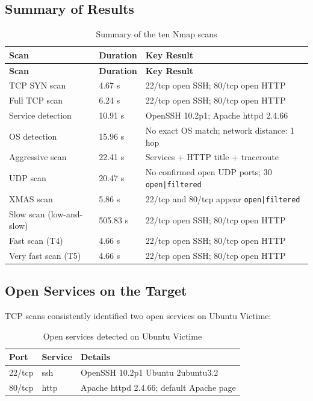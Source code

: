 \subsection{Summary of Results}

\begin{longtable}{p{3.2cm}p{2.2cm}p{7.5cm}}
\caption{Summary of the ten Nmap scans} \label{tab:synthese-scans} \\
\toprule
\textbf{Scan} & \textbf{Duration} & \textbf{Key Result} \\
\midrule
\endfirsthead
\toprule
\textbf{Scan} & \textbf{Duration} & \textbf{Key Result} \\
\midrule
\endhead
TCP SYN scan & 4.67 s & 22/tcp open SSH; 80/tcp open HTTP \\
Full TCP scan & 6.24 s & 22/tcp open SSH; 80/tcp open HTTP \\
Service detection & 10.91 s & OpenSSH 10.2p1; Apache httpd 2.4.66 \\
OS detection & 15.96 s & No exact OS match; network distance: 1 hop \\
Aggressive scan & 22.41 s & Services + HTTP title + traceroute \\
UDP scan & 20.47 s & No confirmed open UDP ports; 30 \texttt{open|filtered} \\
XMAS scan & 5.86 s & 22/tcp and 80/tcp appear \texttt{open|filtered} \\
Slow scan (low-and-slow) & 505.83 s & 22/tcp open SSH; 80/tcp open HTTP \\
Fast scan (T4) & 4.66 s & 22/tcp open SSH; 80/tcp open HTTP \\
Very fast scan (T5) & 4.66 s & 22/tcp open SSH; 80/tcp open HTTP \\
\bottomrule
\end{longtable}

\subsection{Open Services on the Target}

TCP scans consistently identified two open services on Ubuntu Victime:

\begin{table}[H]
\centering
\caption{Open services detected on Ubuntu Victime}
\label{tab:services}
\begin{tabular}{lll}
\toprule
\textbf{Port} & \textbf{Service} & \textbf{Details} \\
\midrule
22/tcp & ssh & OpenSSH 10.2p1 Ubuntu 2ubuntu3.2 \\
80/tcp & http & Apache httpd 2.4.66; default Apache page \\
\bottomrule
\end{tabular}
\end{table}

